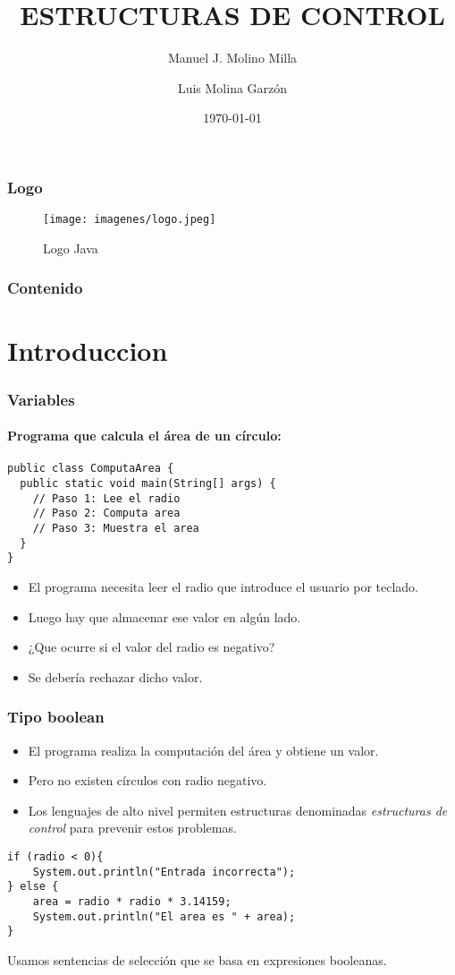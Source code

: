 \documentclass{beamer}
\title{ESTRUCTURAS DE CONTROL}
\author{Manuel J. Molino Milla \and Luis Molina Garzón}
\date{\today} %
\institute{IES Virgen del Carmen \and Departamento de Informática}
\begin{document}
\begin{frame}
  \titlepage
\end{frame}

\begin{frame}
    \frametitle{Logo}
\begin{figure}
\texttt{[image: imagenes/logo.jpeg]} 
\caption{Logo Java}
\end{figure}
\end{frame}

\begin{frame}
  \frametitle{Contenido}
  \tableofcontents[pausesections]
\end{frame}



\section{Introduccion}

\begin{frame}[fragile]
    \frametitle{Variables}
    \framesubtitle{Programa que calcula el área de un círculo:}
    \begin{verbatim}
public class ComputaArea {
  public static void main(String[] args) {
    // Paso 1: Lee el radio
    // Paso 2: Computa area 
    // Paso 3: Muestra el area
  }
}
\end{verbatim}
\pause
\begin{itemize}[<+-| alert@+>]
      \item El programa necesita leer el radio que introduce el usuario por teclado.
      \item Luego hay que almacenar ese valor en algún lado.
	\item ¿Que ocurre si el valor del radio es negativo?
	      \item Se debería rechazar dicho valor.

\end{itemize}
\pause
\end{frame}

\begin{frame}[fragile]
    \frametitle{Tipo boolean}

\begin{itemize}[<+-| alert@+>]
      \item El programa realiza la computación del área y obtiene un valor.
      \item Pero no existen círculos con radio negativo.
      \item Los lenguajes de alto nivel permiten estructuras denominadas \emph{estructuras de control} para prevenir estos problemas.
     \end{itemize}
     \pause
     \begin{verbatim}
if (radio < 0){
    System.out.println("Entrada incorrecta");
} else {
    area = radio * radio * 3.14159;
    System.out.println("El area es " + area);
}
\end{verbatim}
\pause
Usamos sentencias de selección que se basa en expresiones booleanas.
\end{frame}
\end{document}
